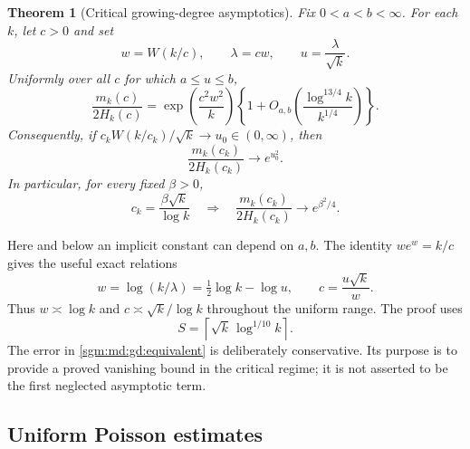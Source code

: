 \documentclass[11pt,letterpaper]{article}
\newtheorem{theorem}{Theorem}[section]
\theoremstyle{remark}\newtheorem{remark}[theorem]{Remark}
\theoremstyle{definition}\newtheorem{definition}[theorem]{Definition}
\begin{document}
\begin{theorem}[Critical growing-degree asymptotics]\label{sgm:md:gd:main}
Fix $0<a<b<\infty$.  For each $k$, let $c>0$ and set
\[
 w=W(k/c),\qquad \lambda=cw,\qquad u=\frac{\lambda}{\sqrt{k}}.
\]
Uniformly over all $c$ for which $a\le u\le b$,
\begin{equation}\label{sgm:md:gd:equivalent}
 \frac{m_k(c)}{2H_k(c)}
 =\exp\!\left(\frac{c^2w^2}{k}\right)
 \left\{1+O_{a,b}\!\left(
      \frac{\log^{13/4}k}{k^{1/4}}\right)\right\}.
\end{equation}
Consequently, if $c_kW(k/c_k)/\sqrt{k}\to u_0\in(0,\infty)$, then
\[
 \frac{m_k(c_k)}{2H_k(c_k)}\longrightarrow e^{u_0^2}.
\]
In particular, for every fixed $\beta>0$,
\begin{equation}\label{sgm:md:gd:beta}
 c_k=\frac{\beta\sqrt{k}}{\log k}
 \quad\Longrightarrow\quad
 \frac{m_k(c_k)}{2H_k(c_k)}\longrightarrow e^{\beta^2/4}.
\end{equation}
\end{theorem}

Here and below an implicit constant can depend on $a,b$.  The identity
$we^w=k/c$ gives the useful exact relations
\begin{equation}\label{sgm:md:gd:scales}
 w=\log(k/\lambda)=\tfrac12\log k-\log u,
 \qquad c=\frac{u\sqrt{k}}{w}.
\end{equation}
Thus $w\asymp\log k$ and $c\asymp\sqrt{k}/\log k$ throughout the
uniform range.  The proof uses
\begin{equation}\label{sgm:md:gd:S}
 S=\left\lceil\sqrt{k}\,\log^{1/10}k\right\rceil.
\end{equation}
The error in \eqref{sgm:md:gd:equivalent} is deliberately conservative.  Its
purpose is to provide a proved vanishing bound in the critical regime;
it is not asserted to be the first neglected asymptotic term.

\subsection{Uniform Poisson estimates}
\end{document}

